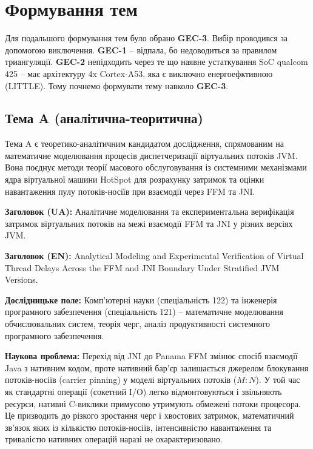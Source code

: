 \section{Формування тем}

Для подальшого формування тем було обрано \textbf{GEC-3}. Вибір проводився за допомогою виключення. \textbf{GEC-1} -- відпала, бо недоводиться за правилом триангуляції. \textbf{GEC-2} непідходить через те що наявне устаткування SoC qualcom 425 -- має архітектуру 4x Cortex-A53, яка є виключно енергоефктивною (LITTLE). Тому почнемо формувати тему навколо \textbf{GEC-3}.

\subsection{Тема A (аналітична-теоритична)}

Тема A є теоретико-аналітичним кандидатом дослідження, спрямованим на математичне моделювання процесів диспетчеризації віртуальних потоків JVM. Вона поєднує методи теорії масового обслуговування із системними механізмами ядра віртуальної машини HotSpot для розрахунку затримок та оцінки навантаження пулу потоків-носіїв при взаємодії через FFM та JNI.

\textbf{Заголовок (UA):} Аналітичне моделювання та експериментальна верифікація затримок віртуальних потоків на межі взаємодії FFM та JNI у різних версіях JVM.

\textbf{Заголовок (EN):} \foreignlanguage{english}{Analytical Modeling and Experimental Verification of Virtual Thread Delays Across the FFM and JNI Boundary Under Stratified JVM Versions.}

\textbf{Дослідницьке поле:} Комп'ютерні науки (спеціальність 122) та інженерія програмного забезпечення (спеціальність 121) -- математичне моделювання обчислювальних систем, теорія черг, аналіз продуктивності системного програмного забезпечення.

\textbf{Наукова проблема:} Перехід від JNI до Panama FFM змінює спосіб взаємодії Java з нативним кодом, проте нативний бар'єр залишається джерелом блокування потоків-носіїв (carrier pinning) у моделі віртуальних потоків ($M:N$). У той час як стандартні операції (сокетний I/O) легко відмонтовуються і звільняють ресурси, нативні C-виклики примусово утримують обмежені потоки процесора. Це призводить до різкого зростання черг і хвостових затримок, математичний зв'язок яких із кількістю потоків-носіїв, інтенсивністю навантаження та тривалістю нативних операцій наразі не охарактеризовано.

